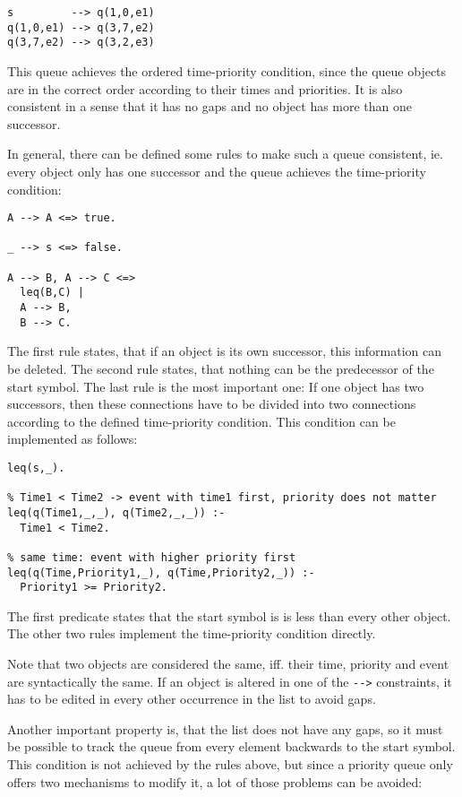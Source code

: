 \begin{lstlisting}
s         --> q(1,0,e1)
q(1,0,e1) --> q(3,7,e2)
q(3,7,e2) --> q(3,2,e3)
\end{lstlisting}

This queue achieves the ordered time-priority condition, since the queue objects are in the correct order according to their times and priorities. It is also consistent in a sense that it has no gaps and no object has more than one successor.

In general, there can be defined some rules to make such a queue consistent, ie. every object only has one successor and the queue achieves the time-priority condition:

\begin{lstlisting}
A --> A <=> true.

_ --> s <=> false.

A --> B, A --> C <=>
  leq(B,C) |
  A --> B,
  B --> C.
\end{lstlisting}

The first rule states, that if an object is its own successor, this information can be deleted. The second rule states, that nothing can be the predecessor of the start symbol. The last rule is the most important one: If one object has two successors, then these connections have to be divided into two connections according to the defined time-priority condition. This condition can be implemented as follows:

\begin{lstlisting}
leq(s,_).

% Time1 < Time2 -> event with time1 first, priority does not matter
leq(q(Time1,_,_), q(Time2,_,_)) :- 
  Time1 < Time2.

% same time: event with higher priority first
leq(q(Time,Priority1,_), q(Time,Priority2,_)) :- 
  Priority1 >= Priority2.
\end{lstlisting}

The first predicate states that the start symbol is is less than every other object. The other two rules implement the time-priority condition directly.

Note that two objects are considered the same, iff. their time, priority and event are syntactically the same. If an object is altered in one of the \verb|-->| constraints, it has to be edited in every other occurrence in the   list to avoid gaps.

Another important property is, that the list does not have any gaps, so it must be possible to track the queue from every element backwards to the start symbol. This condition is not achieved by the rules above, but since a priority queue only offers two mechanisms to modify it, a lot of those problems can be avoided:


